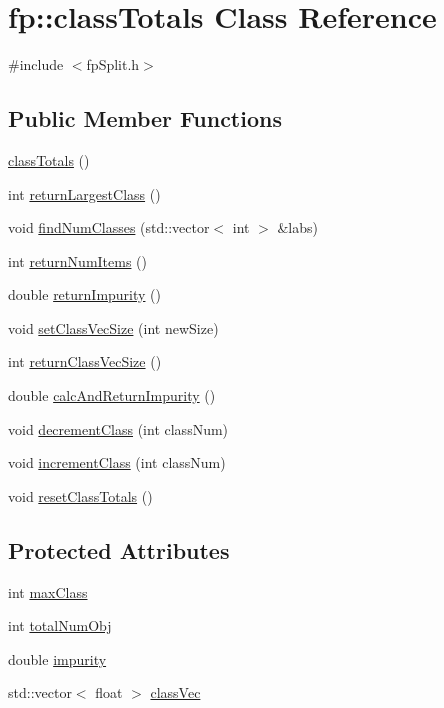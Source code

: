 \hypertarget{classfp_1_1classTotals}{}\section{fp\+:\+:class\+Totals Class Reference}
\label{classfp_1_1classTotals}


{\ttfamily \#include $<$fp\+Split.\+h$>$}

\subsection*{Public Member Functions}
\begin{DoxyCompactItemize}
\item 
\hyperlink{classfp_1_1classTotals_af1d0b6b91ce2569bf672f1b7d9ce911f}{class\+Totals} ()
\item 
int \hyperlink{classfp_1_1classTotals_ace51088c43d444d4bcdbe423909c5b91}{return\+Largest\+Class} ()
\item 
void \hyperlink{classfp_1_1classTotals_a4d042d3a31d3f03d577bd4ad02bb5e6a}{find\+Num\+Classes} (std\+::vector$<$ int $>$ \&labs)
\item 
int \hyperlink{classfp_1_1classTotals_ad4bc21663842003780efaf9fd2b75360}{return\+Num\+Items} ()
\item 
double \hyperlink{classfp_1_1classTotals_a82993575e2ad13f057f01050a52ef4ce}{return\+Impurity} ()
\item 
void \hyperlink{classfp_1_1classTotals_a026ec5ce8d0ad54702891c0d6ba51fc8}{set\+Class\+Vec\+Size} (int new\+Size)
\item 
int \hyperlink{classfp_1_1classTotals_a088c363e5ae669d52e4836bc900d6a73}{return\+Class\+Vec\+Size} ()
\item 
double \hyperlink{classfp_1_1classTotals_a94eaf5d719442de6f7014b0630932bb8}{calc\+And\+Return\+Impurity} ()
\item 
void \hyperlink{classfp_1_1classTotals_af388dc1e664488603f7834da2f097a06}{decrement\+Class} (int class\+Num)
\item 
void \hyperlink{classfp_1_1classTotals_aa05c13b36638adc361d638559c43a447}{increment\+Class} (int class\+Num)
\item 
void \hyperlink{classfp_1_1classTotals_ab0ad9daa63bc410ae15f344b86386f87}{reset\+Class\+Totals} ()
\end{DoxyCompactItemize}
\subsection*{Protected Attributes}
\begin{DoxyCompactItemize}
\item 
int \hyperlink{classfp_1_1classTotals_a83aa8e17bf3b31db3ae19b9ab554624b}{max\+Class}
\item 
int \hyperlink{classfp_1_1classTotals_a97be63e3e4a1b7c553df839034828aae}{total\+Num\+Obj}
\item 
double \hyperlink{classfp_1_1classTotals_acd239321a9b15e93e6de272c70b301b3}{impurity}
\item 
std\+::vector$<$ float $>$ \hyperlink{classfp_1_1classTotals_af96102537592dbda8601d0235dfccfca}{class\+Vec}
\end{DoxyCompactItemize}



